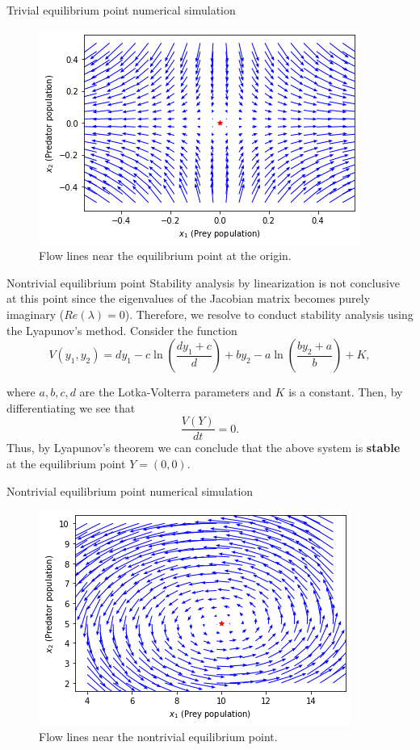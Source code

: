 \documentclass{beamer}
\begin{document}
\begin{frame}{Trivial equilibrium point numerical simulation}
    \begin{figure}[h]
\centering
\includegraphics[scale=0.60]{images/origin.png}
\caption{Flow lines near the equilibrium point at the origin.}
\end{figure}
\end{frame}

\begin{frame}{Nontrivial equilibrium point}
Stability analysis by linearization is not conclusive at this point since the eigenvalues of the Jacobian matrix becomes purely imaginary ($Re(\lambda)=0$).
\newline\newline
Therefore, we resolve to conduct stability analysis using the Lyapunov's method.
Consider the function 
\begin{equation}\label{energy}
    V(y_1,y_2) = dy_1 - c \ln\left(\frac{dy_1+c}{d}\right)+by_2- a \ln\left(\frac{by_2+a}{b}\right)+K,
\end{equation}

where $a,b,c,d$ are the Lotka-Volterra parameters and $K$ is a constant. Then, by differentiating we see that
$$\frac{V(Y)}{dt}=0.$$ Thus, by Lyapunov's theorem we can conclude that the above system is \textbf{stable} at the equilibrium point $Y=(0,0)$.
\end{frame}

\begin{frame}{Nontrivial equilibrium point numerical simulation}
    \begin{figure}[h]
\centering
\includegraphics[scale=0.60]{images/nontrivial.png}
\caption{Flow lines near the nontrivial equilibrium point.}
\end{figure}
\end{frame}
\end{document}
